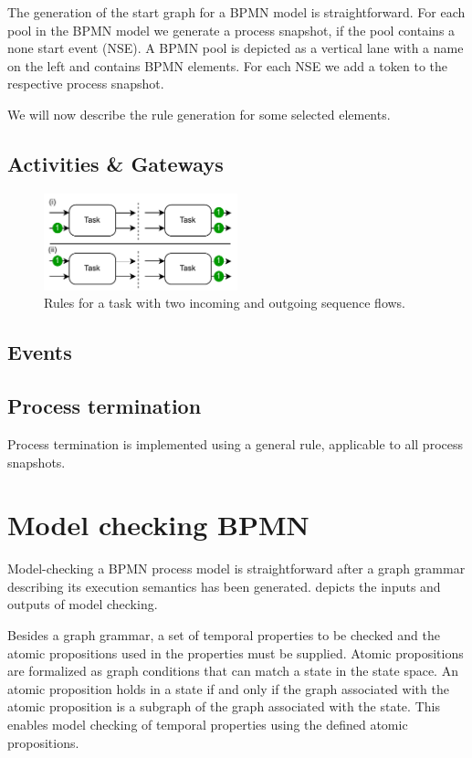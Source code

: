 \documentclass[adraft, copyright, creativecommons]{eptcs} %
\begin{document}
The generation of the start graph for a BPMN model is straightforward.
For each pool in the BPMN model we generate a process snapshot, if the pool contains a none start event (NSE).
A BPMN pool is depicted as a vertical lane with a name on the left and contains BPMN elements.
For each NSE we add a token to the respective process snapshot.

We will now describe the rule generation for some selected elements.
\subsection{Activities \& Gateways}
\begin{figure}[h]
    \centering
    \includegraphics[width=0.5\textwidth]{images/bpmn_semantics-task-rules.pdf}
    \caption{Rules for a task with two incoming and outgoing sequence flows.}
    \label{fig:taskRules}
\end{figure}

\subsection{Events}

\subsection{Process termination}
Process termination is implemented using a general rule, applicable to all process snapshots.


\section{Model checking BPMN} \label{sec:modelChecking}

Model-checking a BPMN process model is straightforward after a graph grammar describing its execution semantics has been generated.
 depicts the inputs and outputs of model checking.

Besides a graph grammar, a set of temporal properties to be checked and the atomic propositions used in the properties must be supplied.
Atomic propositions are formalized as graph conditions that can match a state in the state space.
An atomic proposition holds in a state if and only if the graph associated with the atomic proposition is a subgraph of the graph associated with the state. %
This enables model checking of temporal properties using the defined atomic propositions.
\end{document}
